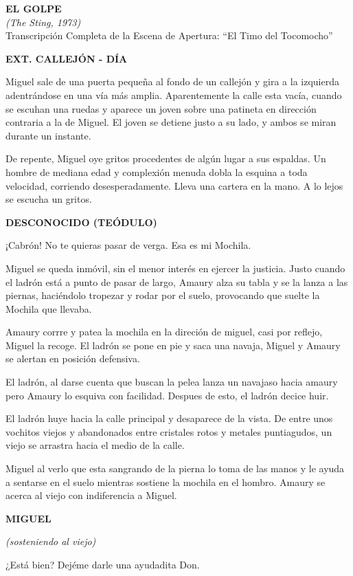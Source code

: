 \documentclass[11pt]{report}
\newenvironment{scenedesc}{\vspace{1em}\par\noindent\small\rmfamily}{\vspace{1em}}
\newenvironment{dialogue}[1]{
    \vspace{0.5em}\par\begin{center}\textbf{\MakeUppercase{#1}}\end{center}\vspace{-0.5em}
    \begin{list}{}{
        \leftmargin=1.5in
        \rightmargin=1.5in
        \parsep=0pt
    }\item[]
}{
    \end{list}\vspace{0.5em}
}
\newcommand{\parenthetical}[1]{\vspace{-0.3em}\begin{center}\textit{(#1)}\end{center}\vspace{-0.3em}}
\begin{document}
\begin{center}
    \LARGE \textbf{EL GOLPE} \\
    \large \textit{(The Sting, 1973)} \\
    \vspace{1em}
    \small Transcripción Completa de la Escena de Apertura: ``El Timo del Tocomocho''
\end{center}
\raggedright

\vspace{2em}

\textbf{EXT. CALLEJÓN - DÍA}

\begin{scenedesc}
Miguel sale de una puerta pequeña al fondo de un callejón  y gira a la izquierda adentrándose en una vía más amplia. Aparentemente la calle esta vacía, cuando se escuhan una ruedas y aparece un joven sobre una patineta en dirección contraria a la de Miguel. El joven se detiene justo a su lado, y ambos se miran durante un instante. 

De repente, Miguel oye gritos procedentes de algún lugar a sus espaldas. Un hombre de mediana edad y complexión menuda dobla la esquina a toda velocidad, corriendo desesperadamente. Lleva una cartera en la mano. A lo lejos se escucha un gritos.
\end{scenedesc}

\begin{dialogue}{Desconocido (Teódulo)}
¡Cabrón! No te quieras pasar de verga. Esa es mi Mochila. 
\end{dialogue}

\begin{scenedesc}
Miguel se queda inmóvil, sin el menor interés en ejercer la justicia. Justo cuando el ladrón está a punto de pasar de largo, Amaury alza su tabla y se la lanza a las piernas, haciéndolo tropezar y rodar por el suelo, provocando que suelte la Mochila que llevaba.

Amaury corrre y patea la mochila en la direción de miguel, casi por reflejo, Miguel la recoge. El ladrón se pone en pie y saca una navaja, Miguel y Amaury se alertan en posición defensiva.

El ladrón, al darse cuenta que buscan la pelea lanza un navajaso hacia amaury pero Amaury lo esquiva con facilidad. Despues de esto, el ladrón decice huir.  
\end{scenedesc}

\begin{scenedesc}
El ladrón huye hacia la calle principal y desaparece de la vista. De entre unos vochitos  viejos y abandonados entre cristales rotos y metales puntiagudos, un viejo se arrastra hacia el medio de la calle. 

Miguel al verlo que esta sangrando de la pierna lo toma de las manos y le ayuda a sentarse en el suelo mientras sostiene la mochila en el hombro. Amaury se acerca al viejo con indiferencia a Miguel.  
\end{scenedesc}
\begin{dialogue}{Miguel}
\parenthetical{sosteniendo al viejo}
¿Está bien? Dejéme darle una ayudadita Don.
\end{dialogue}
\end{document}
